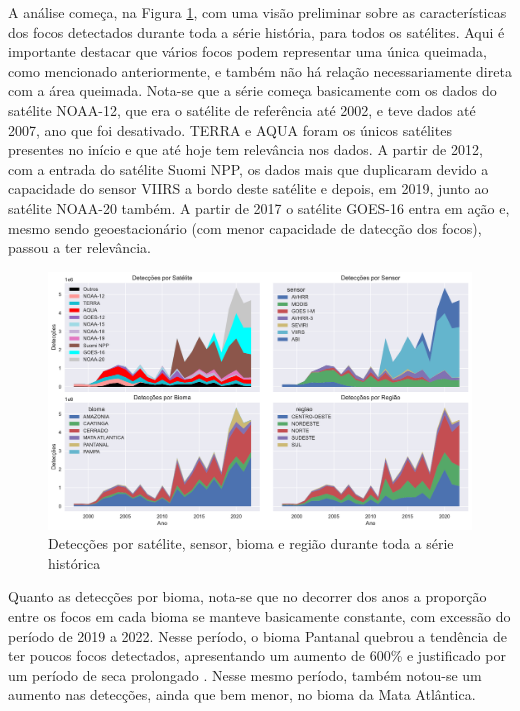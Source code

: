\documentclass[cic,tc]{iiufrgs}
\begin{document}
A análise começa, na Figura \ref{fig:medicoes_nos_anos}, com uma visão preliminar sobre as características dos focos detectados durante toda a série história, para todos os satélites. Aqui é importante destacar que vários focos podem representar uma única queimada, como mencionado anteriormente, e também não há relação necessariamente direta com a área queimada. Nota-se que a série começa basicamente com os dados do satélite NOAA-12, que era o satélite de referência até 2002, e teve dados até 2007, ano que foi desativado. TERRA e AQUA foram os únicos satélites presentes no início e que até hoje tem relevância nos dados. A partir de 2012, com a entrada do satélite Suomi NPP, os dados mais que duplicaram devido a capacidade do sensor VIIRS a bordo deste satélite e depois, em 2019, junto ao satélite NOAA-20 também. A partir de 2017 o satélite GOES-16 entra em ação e, mesmo sendo geoestacionário (com menor capacidade de datecção dos focos), passou a ter relevância.


\begin{figure}[H]
    \caption{Detecções por satélite, sensor, bioma e região durante toda a série histórica}
    \begin{center}
        \includegraphics[width=35em]{medicoes_nos_anos}
    \end{center}
    \label{fig:medicoes_nos_anos}
\end{figure}

Quanto as detecções por bioma, nota-se que no decorrer dos anos a proporção entre os focos em cada bioma se manteve basicamente constante, com excessão do período de 2019 a 2022. Nesse período, o bioma Pantanal quebrou a tendência de ter poucos focos detectados, apresentando um aumento de 600\% e justificado por um período de seca prolongado \cite{pantanal2021dinamica}. Nesse mesmo período, também notou-se um aumento nas detecções, ainda que bem menor, no bioma da Mata Atlântica.
\end{document}
